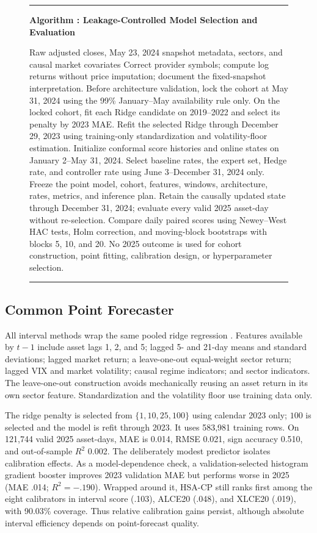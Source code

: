 \documentclass[conference]{IEEEtran}
\newcounter{algorithm}
\newcommand{\algcaption}[1]{%
  \refstepcounter{algorithm}\noindent\textbf{Algorithm \thealgorithm: #1}\par\smallskip}
\begin{document}
\begin{figure}[t]
\small
\hrule\vspace{3pt}
\algcaption{Leakage-Controlled Model Selection and Evaluation}\label{alg:protocol}
\begin{algorithmic}[1]
\REQUIRE Raw adjusted closes, May 23, 2024 snapshot metadata, sectors, and causal market covariates
\STATE Correct provider symbols; compute log returns without price imputation; document the fixed-snapshot interpretation.
\STATE Before architecture validation, lock the cohort at May 31, 2024 using the 99\% January--May availability rule only.
\STATE On the locked cohort, fit each Ridge candidate on 2019--2022 and select its penalty by 2023 MAE.
\STATE Refit the selected Ridge through December 29, 2023 using training-only standardization and volatility-floor estimation.
\STATE Initialize conformal score histories and online states on January 2--May 31, 2024.
\STATE Select baseline rates, the expert set, Hedge rate, and controller rate using June 3--December 31, 2024 only.
\STATE Freeze the point model, cohort, features, windows, architecture, rates, metrics, and inference plan.
\STATE Retain the causally updated state through December 31, 2024; evaluate every valid 2025 asset-day without re-selection.
\STATE Compare daily paired scores using Newey--West HAC tests, Holm correction, and moving-block bootstraps with blocks 5, 10, and 20.
\ENSURE No 2025 outcome is used for cohort construction, point fitting, calibration design, or hyperparameter selection.
\end{algorithmic}
\vspace{2pt}\hrule
\end{figure}

\subsection{Common Point Forecaster}

All interval methods wrap the same pooled ridge regression \cite{hoerl1970ridge}. Features available by $t-1$ include asset lags 1, 2, and 5; lagged 5- and 21-day means and standard deviations; lagged market return; a leave-one-out equal-weight sector return; lagged VIX and market volatility; causal regime indicators; and sector indicators. The leave-one-out construction avoids mechanically reusing an asset return in its own sector feature. Standardization and the volatility floor use training data only.

The ridge penalty is selected from $\{1,10,25,100\}$ using calendar 2023 only; $100$ is selected and the model is refit through 2023. It uses 583,981 training rows. On 121,744 valid 2025 asset-days, MAE is 0.014, RMSE 0.021, sign accuracy 0.510, and out-of-sample $R^2$ 0.002. The deliberately modest predictor isolates calibration effects. As a model-dependence check, a validation-selected histogram gradient booster improves 2023 validation MAE but performs worse in 2025 (MAE .014; $R^2=-.190$). Wrapped around it, HSA-CP still ranks first among the eight calibrators in interval score (.103), ALCE20 (.048), and XLCE20 (.019), with 90.03\% coverage. Thus relative calibration gains persist, although absolute interval efficiency depends on point-forecast quality.
\end{document}
